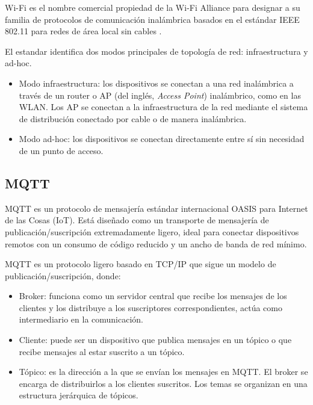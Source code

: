 Wi-Fi es el nombre comercial propiedad de la Wi-Fi Alliance para designar a su
familia de protocolos de comunicación inalámbrica basados en el estándar IEEE
802.11 para redes de área local sin cables \cite{Li2019}.

El estandar identifica dos modos principales de topología de red:
infraestructura y ad-hoc.

\begin{itemize}
	\item Modo infraestructura: los dispositivos se conectan a una red inalámbrica a
	      través de un router o AP (del inglés, \textit{Access Point}) inalámbrico, como
	      en las WLAN. Los AP se conectan a la infraestructura de la red mediante el
	      sistema de distribución conectado por cable o de manera inalámbrica.
	\item Modo ad-hoc: los dispositivos se conectan directamente entre sí sin necesidad
	      de un punto de acceso.
\end{itemize}

\subsection{MQTT}

MQTT es un protocolo de mensajería estándar internacional OASIS
\cite{OASIS_MQTT_Standard} para Internet de las Cosas (IoT). Está diseñado como
un transporte de mensajería de publicación/suscripción extremadamente ligero,
ideal para conectar dispositivos remotos con un consumo de código reducido y un
ancho de banda de red mínimo.

MQTT es un protocolo ligero basado en TCP/IP \cite{AWS_MQTT} que sigue un
modelo de publicación/suscripción, donde:

\begin{itemize}
	\item Broker: funciona como un servidor central que recibe los mensajes de los
	      clientes y los distribuye a los suscriptores correspondientes, actúa como
	      intermediario en la comunicación.
	\item Cliente: puede ser un dispositivo que publica mensajes en un tópico o que
	      recibe mensajes al estar suscrito a un tópico.
	\item Tópico: es la dirección a la que se envían los mensajes en MQTT. El broker se
	      encarga de distribuirlos a los clientes suscritos. Los temas se organizan en
	      una estructura jerárquica de tópicos.
\end{itemize}

